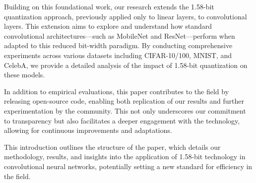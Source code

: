 \documentclass{article}
\begin{document}
Building on this foundational work, our research extends the 1.58-bit quantization approach, previously applied only to linear layers, to convolutional layers. This extension aims to explore and understand how standard convolutional architectures—such as MobileNet and ResNet—perform when adapted to this reduced bit-width paradigm. By conducting comprehensive experiments across various datasets including CIFAR-10/100, MNIST, and CelebA, we provide a detailed analysis of the impact of 1.58-bit quantization on these models.

In addition to empirical evaluations, this paper contributes to the field by releasing open-source code, enabling both replication of our results and further experimentation by the community. This not only underscores our commitment to transparency but also facilitates a deeper engagement with the technology, allowing for continuous improvements and adaptations.

This introduction outlines the structure of the paper, which details our methodology, results, and insights into the application of 1.58-bit technology in convolutional neural networks, potentially setting a new standard for efficiency in the field.



\end{document}
